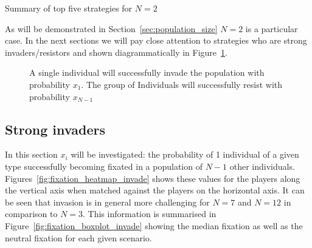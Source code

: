 \documentclass{article}
\begin{document}
\begin{table}[!hbtp]
    \centering
    
    \caption{Summary of top five strategies for \(N=2\)}
    \label{tbl:summary_top_2}
\end{table}

As will be demonstrated in Section~\ref{sec:population_size} \(N=2\)
is a particular case. In the next sections we will pay close attention to
strategies who are strong invaders/resistors and shown diagrammatically in
Figure~\ref{fig:invasion_resistance}.

\begin{figure}[!hbtp]
    \centering
    
    \caption{A single individual will successfully invade the population with
    probability \(x_1\). The group of Individuals will successfully resist with
    probability \(x_{N-1}\)}
    \label{fig:invasion_resistance}
\end{figure}

\subsection{Strong invaders}\label{sec:strong_invaders}

In this section \(x_i\) will be investigated: the probability of 1 individual of
a given type successfully becoming fixated in a population of \(N - 1\) other
individuals. Figures~\ref{fig:fixation_heatmap_invade} shows these values for
the players along the vertical axis when matched against the players on the
horizontal axis. It can be seen that invasion is in general more challenging for
\(N=7\) and \(N=12\) in comparison to \(N=3\).
This information is summarised in Figure~\ref{fig:fixation_boxplot_invade}
showing the median fixation as well as the neutral fixation for each given
scenario.
\end{document}
